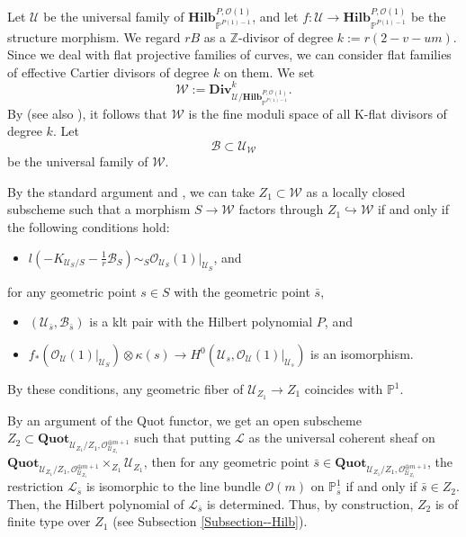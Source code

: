 \documentclass[12pt,twoside]{amsart}
\theoremstyle{definition}
\begin{document}
Let $\mathcal{U}$ be the universal family of $\mathbf{Hilb}^{P,\mathcal{O}(1)}_{\mathbb{P}^{P(1)-1}}$, and let $f \colon \mathcal{U} \to \mathbf{Hilb}^{P,\mathcal{O}(1)}_{\mathbb{P}^{P(1)-1}}$ be the structure morphism. 
We regard $rB$ as a $\mathbb{Z}$-divisor of degree $k:=r(2-v-um)$. 
Since we deal with flat projective families of curves, we can consider flat families of effective Cartier divisors of degree $k$ on them.  
We set 
$$\mathcal{W}:=\mathbf{Div}_{\mathcal{U}/\mathbf{Hilb}^{P,\mathcal{O}(1)}_{\mathbb{P}^{P(1)-1}}}^k.$$
By \cite[Corollary 7.53 and Theorem 7.40]{kollar-moduli} (see also \cite[Definition 7.37]{kollar-moduli}), it follows that $\mathcal{W}$ is the fine moduli space of all K-flat divisors of degree $k$. 
Let 
$$\mathcal{B} \subset \mathcal{U}_{\mathcal{W}}$$
be the universal family of $\mathcal{W}$. 

By the standard argument and \cite[Proposition 9.42]{kollar-moduli}, we can take $Z_1\subset \mathcal{W}$ as a locally closed subscheme such that a morphism $S \to \mathcal{W}$ factors through $Z_{1} \hookrightarrow \mathcal{W}$ if and only if the following conditions hold:
\begin{itemize}
\item 
$l(-K_{\mathcal{U}_{S}/S}-\frac{1}{r}\mathcal{B}_{S})\sim_{S}\mathcal{O}_{\mathcal{U}_{S}}(1)|_{\mathcal{U}_{S}}$, and
\end{itemize}
for any geometric point $s \in S$ with the geometric point $\bar{s}$, 
\begin{itemize}
\item
$(\mathcal{U}_{\bar{s}},\mathcal{B}_{\bar{s}})$ is a klt pair with the Hilbert polynomial $P$, and
\item
$f_*(\mathcal{O}_{\mathcal{U}}(1)|_{\mathcal{U}_{S}})\otimes \kappa(s)\to H^0(\mathcal{U}_{s},\mathcal{O}_{\mathcal{U}}(1)|_{\mathcal{U}_{s}})$ is an isomorphism. 
\end{itemize}
 By these conditions, any geometric fiber of $\mathcal{U}_{Z_1}\to Z_1$ coincides with $\mathbb{P}^1$. 
 
By an argument of the Quot functor, we get an open subscheme $Z_2\subset \mathbf{Quot}_{\mathcal{U}_{Z_1}/Z_1,\mathcal{O}_{\mathcal{U}_{Z_1}}^{\oplus m+1}}$ such that putting $\mathscr{L}$ as the universal coherent sheaf on $\mathbf{Quot}_{\mathcal{U}_{Z_1}/Z_1,\mathcal{O}_{\mathcal{U}_{Z_1}}^{\oplus m+1}}\times_{Z_1} \mathcal{U}_{Z_1}$, then for any geometric point $\bar{s}\in \mathbf{Quot}_{\mathcal{U}_{Z_1}/Z_1,\mathcal{O}_{\mathcal{U}_{Z_1}}^{\oplus m+1}}$, the restriction $\mathscr{L}_{\bar{s}}$ is isomorphic to the line bundle $\mathcal{O}(m)$ on $\mathbb{P}^1_{\bar{s}}$ if and only if $\bar{s}\in Z_2$. 
Then, the Hilbert polynomial of $\mathscr{L}_{\bar{s}}$ is determined.
Thus, by construction, $Z_2$ is of finite type over $Z_1$ (see Subsection \ref{Subsection--Hilb}).
\end{document}
